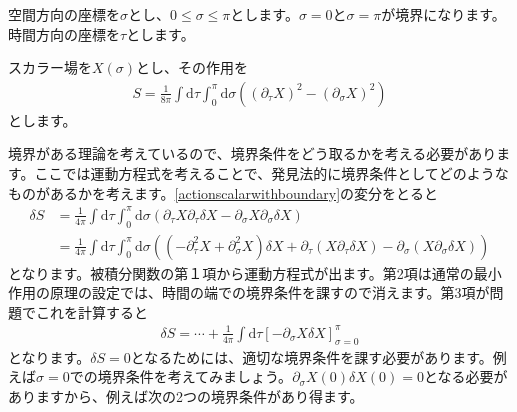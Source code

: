 \documentclass[report,paper=a4, fontsize=12pt, line_length=16cm, number_of_lines=33,dvipdfmx]{jlreq}
\numberwithin{equation}{chapter}
\numberwithin{equation}{section}
\newcommand{\del}{\partial}
\newcommand{\di}{\mathrm{d}}
\begin{document}
空間方向の座標を$\sigma$とし、$0\le \sigma \le \pi$とします。$\sigma=0$と$\sigma=\pi$が境界になります。時間方向の座標を$\tau$とします。

スカラー場を$X(\sigma)$とし、その作用を
\begin{align}
  S=\frac{1}{8\pi}\int \di \tau \int_{0}^{\pi}\di \sigma \left( (\del_{\tau}X)^2-(\del_{\sigma}X)^2 \right)
  \label{actionscalarwithboundary}
\end{align}
とします。

境界がある理論を考えているので、境界条件をどう取るかを考える必要があります。ここでは運動方程式を考えることで、発見法的に境界条件としてどのようなものがあるかを考えます。\eqref{actionscalarwithboundary}の変分をとると
\begin{align}
  \delta S&
  =\frac{1}{4\pi}\int \di \tau \int_{0}^{\pi}\di \sigma \left( \del_{\tau}X\del_{\tau}\delta X - \del_{\sigma}X\del_{\sigma}\delta X \right)\nonumber\\
  &=\frac{1}{4\pi}\int \di \tau \int_{0}^{\pi}\di \sigma \left( (-\del_{\tau}^2X+\del_{\sigma}^2X)\delta X+\del_{\tau}(X\del_{\tau}\delta X) - \del_{\sigma}(X\del_{\sigma}\delta X) \right)
\end{align}
となります。被積分関数の第１項から運動方程式が出ます。第2項は通常の最小作用の原理の設定では、時間の端での境界条件を課すので消えます。第3項が問題でこれを計算すると
\begin{align}
  \delta S = \cdots +\frac{1}{4\pi}\int \di \tau [-\del_{\sigma}X \delta X]_{\sigma=0}^{\pi}
\end{align}
となります。$\delta S=0$となるためには、適切な境界条件を課す必要があります。例えば$\sigma=0$での境界条件を考えてみましょう。$\del_{\sigma}X(0)\delta X(0)=0$となる必要がありますから、例えば次の2つの境界条件があり得ます。
\end{document}
